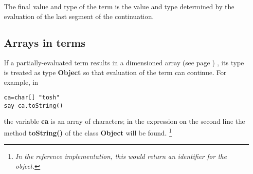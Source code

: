 The final value and type of the term is the value and type determined by
the evaluation of the last segment of the continuation.
\subsection{Arrays in terms}\label{refsarrayp}
 
If a partially-evaluated term results in a dimensioned
 array (see page \pageref{refarray}) , its type is treated as type
\textbf{Object} so that evaluation of the term can continue.  For
example, in
\begin{lstlisting}
ca=char[] "tosh"
say ca.toString()
\end{lstlisting}
the variable \textbf{ca} is an array of characters; in the expression
on the second line the method \textbf{toString()} of the
class \textbf{Object} will be found.
\footnote{
\emph{In the reference implementation, this would return an identifier
for the object.}
}
